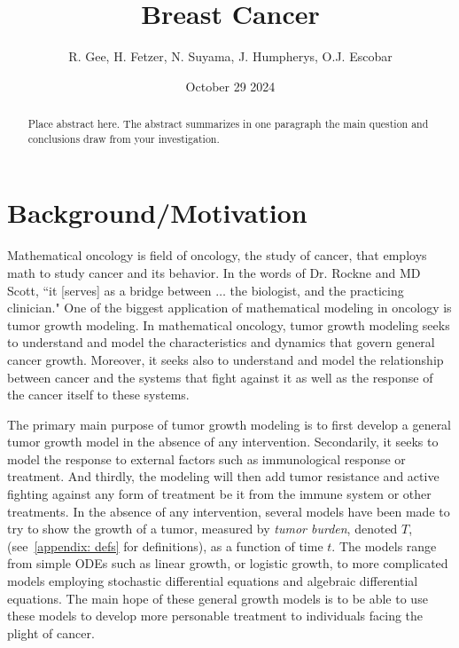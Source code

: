\documentclass[11pt]{amsart}
\title{Breast Cancer}
\author{R. Gee, H. Fetzer, N. Suyama, J. Humpherys, O.J. Escobar}
\date{October 29 2024} %
\begin{document}
\maketitle %

\begin{abstract}
Place abstract here. The abstract summarizes in one paragraph the main question and conclusions draw from your investigation.
\end{abstract}

\section{Background/Motivation}

Mathematical oncology is field of oncology, the study of cancer, that employs math to study cancer and its behavior.
In the words of Dr. Rockne and MD Scott, ``it [serves] as a bridge between $\ldots$ the biologist, and the practicing clinician." \cite{IntroMathOnc}
One of the biggest application of mathematical modeling in oncology is tumor growth modeling.
In mathematical oncology, tumor growth modeling seeks to understand and model the characteristics and dynamics that govern general cancer growth.
Moreover, it seeks also to understand and model the relationship between cancer and the systems that fight against it as well as the response of the cancer itself to these systems.

The primary main purpose of tumor growth modeling is to first develop a general tumor growth model in the absence of any intervention.
Secondarily, it seeks to model the response to external factors such as immunological response or treatment. 
And thirdly, the modeling will then add tumor resistance and active fighting against any form of treatment be it from the immune system or other treatments.
In the absence of any intervention, several models have been made to try to show the growth of a tumor, measured by \textit{tumor burden}, denoted $T$, (see\ \ref{appendix: defs} for definitions), as a function of time $t$.
The models range from simple ODEs such as linear growth, or logistic growth, to more complicated models employing stochastic differential equations and algebraic differential equations. 
The main hope of these general growth models is to be able to use these models to develop more personable treatment to individuals facing the plight of cancer.\ \cite{YinMoes}
\end{document}
